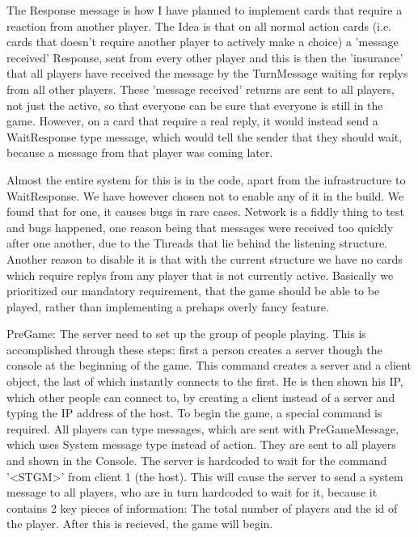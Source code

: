 The Response message is how I have planned to implement cards that require a reaction from another player.
The Idea is that on all normal action cards (i.e. cards that doesn't require another player to actively make a choice) a 'message received' Response, sent from every other player and this is then the 'insurance' that all players have received the message by the TurnMessage waiting for replys from all other players. 
These 'message received' returns are sent to all players, not just the active, so that everyone can be sure that everyone is still in the game.
However, on a card that require a real reply, it would instead send a WaitResponse type message, which would tell the sender that they should wait, because a message from that player was coming later.

Almost the entire system for this is in the code, apart from the infrastructure to WaitResponse. 
We have however chosen not to enable any of it in the build. We found that for one, it causes bugs in rare cases.
Network is a fiddly thing to test and bugs happened, one reason being that messages were received too quickly after one another, due to the Threads that lie behind the listening structure. Another reason to disable it is that with the current structure we have no cards which require replys from any player that is not currently active.
Basically we prioritized our mandatory requirement, that the game should be able to be played, rather than implementing a prehaps overly fancy feature.

PreGame:
The server need to set up the group of people playing. 
This is accomplished through these steps: first a person creates a server though the console at the beginning of the game. 
This command creates a server and a client object, the last of which instantly connects to the first. 
He is then shown his IP, which other people can connect to, by creating a client instead of a server and typing the IP address of the host.
To begin the game, a special command is required. All players can type messages, which are sent with PreGameMessage, which uses System message type instead of action. 
They are sent to all players and shown in the Console. The server is hardcoded to wait for the command '\textless STGM\textgreater' from client 1 (the host). 
This will cause the server to send a system message to all players, who are in turn hardcoded to wait for it, because it contains 2 key pieces of information: The total number of players and the id of the player. 
After this is recieved, the game will begin.

